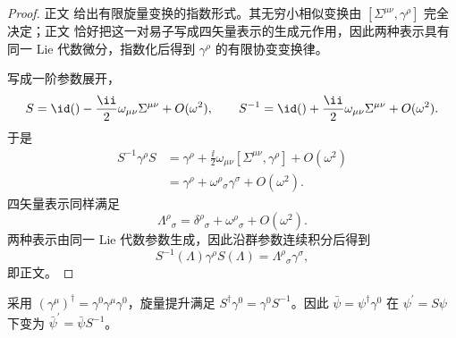 \begin{proof}
正文 给出有限旋量变换的指数形式。其无穷小相似变换由 $[\Sigma^{\mu\nu},\gamma^\rho]$ 完全决定；正文 恰好把这一对易子写成四矢量表示的生成元作用，因此两种表示具有同一 Lie 代数微分，指数化后得到 $\gamma^\rho$ 的有限协变变换律。

写成一阶参数展开，
\begin{equation*}
 S=\id()-\frac{\ii}{2}\omega_{\mu\nu}\Sigma^{\mu\nu}+O(\omega^2),
 \qquad
 S^{-1}=\id()+\frac{\ii}{2}\omega_{\mu\nu}\Sigma^{\mu\nu}+O(\omega^2).
\end{equation*}
于是
\begin{align*}
 S^{-1}\gamma^\rho S
 &=\gamma^\rho+\frac{\ii}{2}\omega_{\mu\nu}
 [\Sigma^{\mu\nu},\gamma^\rho]+O(\omega^2)\\
 &=\gamma^\rho+\omega^\rho{}_{\sigma}\gamma^\sigma+O(\omega^2).
\end{align*}
四矢量表示同样满足
\begin{equation*}
 \Lambda^\rho{}_{\sigma}
 =\delta^\rho{}_{\sigma}+\omega^\rho{}_{\sigma}+O(\omega^2).
\end{equation*}
两种表示由同一 Lie 代数参数生成，因此沿群参数连续积分后得到
\begin{equation*}
 S^{-1}(\Lambda)\gamma^\rho S(\Lambda)
 =\Lambda^\rho{}_{\sigma}\gamma^\sigma,
\end{equation*}
即正文。
\end{proof}

\begin{proposition}
采用 $(\gamma^\mu)^\dagger=\gamma^0\gamma^\mu\gamma^0$，旋量提升满足 $S^\dagger\gamma^0=\gamma^0S^{-1}$。因此 $\bar\psi=\psi^\dagger\gamma^0$ 在 $\psi^\prime=S\psi$ 下变为 $\bar\psi^\prime=\bar\psi S^{-1}$。
\end{proposition}

